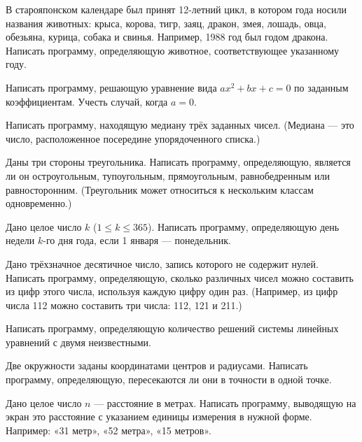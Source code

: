 \task {}В старояпонском календаре был
принят 12-летний цикл, в котором года носили названия животных: крыса,
корова, тигр, заяц, дракон, змея, лошадь, овца, обезьяна, курица,
собака и свинья. Например, 1988 год был годом дракона. Написать
программу, определяющую животное, соответствующее указанному году.

\task Написать программу, решающую уравнение вида $a x^2 + b x + c =
0$ по заданным коэффициентам. Учесть случай, когда $a = 0.$

\task Написать программу, находящую медиану трёх заданных
чисел. (Медиана — это число,
расположенное посередине упорядоченного списка.)

\task Даны три стороны треугольника. Написать программу, определяющую,
является ли он остроугольным, тупоугольным, прямоугольным,
равнобедренным или равносторонним. (Треугольник может относиться к
нескольким классам одновременно.)

\task Дано целое число $k$ ($1 \leqslant k \leqslant 365$). Написать
программу, определяющую день недели $k$-го дня года, если 1 января —
понедельник.

\task Дано трёхзначное десятичное число, запись которого не содержит
нулей. Написать программу, определяющую, сколько различных чисел можно
составить из цифр этого числа, используя каждую цифру один раз.
(Например, из цифр числа 112 можно составить три числа: 112, 121 и 211.)

\task Написать программу, определяющую количество решений системы
линейных уравнений с двумя неизвестными.

\task Две окружности заданы координатами центров и радиусами. Написать
программу, определяющую, пересекаются ли они в точности в одной точке.

\task {}Дано целое
число $n$ — расстояние в метрах. Написать программу, выводящую на
экран это расстояние с указанием единицы измерения в нужной
форме. Например: «31 метр», «52 метра», «15 метров».
